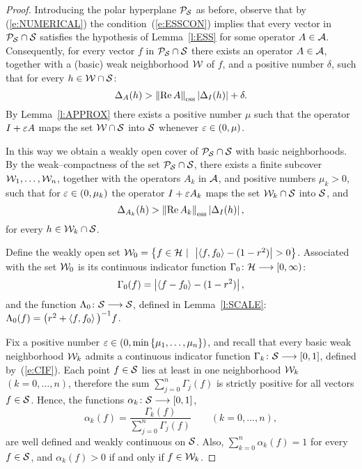 \begin{proof}
Introducing the polar hyperplane ${\cal P}_{{\cal S}}$ as before, observe that by
(\ref{e:NUMERICAL}) the condition~(\ref{e:ESSCON}) implies that every vector
in ${\cal P}_{{\cal S}}\cap{\cal S}$ satisfies the hypothesis of Lemma~\ref{l:ESS} for some
operator $A\in{\cal A}$. Consequently, for every vector $f$ in ${\cal P}_{{\cal S}}\cap{\cal S}$ there
exists an operator $A\in{\cal A}$, together with a (basic) weak neighborhood ${\cal W}$
of $f$, and a positive number $\delta$, such that for every $h\in{\cal W}\cap{\cal S}$:
\[ \Delta_A(h) > \essnorm{\RE{}A}\abs{\Delta_I(h)} + \delta. \]
By Lemma~\ref{l:APPROX} there exists a positive number $\mu$ such that the
operator $I+\varepsilon A$ maps the set ${\cal W}\cap{\cal S}$ into ${\cal S}$ whenever
$\varepsilon\in(0,\mu)$.

\goodbreak
\def\baselinestretch{1.5}

In this way we obtain a weakly open cover of ${\cal P}_{{\cal S}}\cap{\cal S}$ with basic
neighborhoods. By the weak--compactness of the set ${\cal P}_{{\cal S}}\cap{\cal S}$, there
exists a finite subcover ${\cal W}_1,\ldots,{\cal W}_n$, together with the operators
$A_k$ in ${\cal A}$, and positive numbers $\mu_k>0$, such that for
$\varepsilon\in(0,\mu_k)$ the operator $I+\varepsilon{}A_k$ maps the set ${\cal W}_k\cap{\cal S}$ into
${\cal S}$, and
\begin{equation}\label{e:EINEQ}
  \Delta_{A_k}(h) > \essnorm{\RE{}A_k} \abs{\Delta_I(h)},
\end{equation}
for every $h\in{\cal W}_k\cap{\cal S}$.

Define the weakly open set $
{\cal W}_0=\left\{f\in{\cal H}\,\,|\,\,\,\left\vert\left<f,f_0\right>-(1-r^2)\right\vert>0\right\}$. Associated with the
set ${\cal W}_0$ is its continuous indicator function $\Gamma_0\colon{\cal H}\longrightarrow[0,\infty)$:
\[ \Gamma_0(f)=\left\vert\left<f-f_0\right>-(1-r^2)\right\vert, \]
and the function $\Lambda_0\colon{\cal S}\longrightarrow{\cal S}$, defined in Lemma~\ref{l:SCALE}:
$\Lambda_0(f) = \big(r^2+\left<f,f_0\right>\big)^{-1}f$.

\smallskip

Fix a positive number $\varepsilon\in(0,\min\left\{\mu_1,\ldots,\mu_n\right\})$, and recall
that every basic weak neighborhood ${\cal W}_k$ admits a continuous indicator
function $\Gamma_k\colon{\cal S}\longrightarrow[0,1]$, defined by~(\ref{e:CIF}). Each point
$f\in{\cal S}$ lies at least in one neighborhood ${\cal W}_k$ $(k=0,\ldots,n)$, therefore
the sum $\sum_{j=0}^n\Gamma_j(f)$ is strictly positive for all vectors
$f\in{\cal S}$. Hence, the functions $\alpha_k\colon{\cal S}\longrightarrow[0,1]$,
\[ \alpha_k(f) =
   \frac{\Gamma_k(f)}{\sum_{j=0}^n \Gamma_j(f)}
   \quad\quad   (k=0,\ldots,n), \]
are well defined and weakly continuous on ${\cal S}$. Also,
$\sum_{k=0}^n\alpha_k(f)=1$ for every $f \in {\cal S}$, and $\alpha_k(f)>0$ if and
only if $f\in{\cal W}_k$.


\end{proof}
